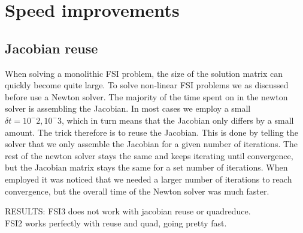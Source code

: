 \chapter{Speed improvements}
\section{Jacobian reuse}
When solving a monolithic FSI problem, the size of the solution matrix can quickly become quite large. To solve non-linear FSI problems we as discussed before use a Newton solver. The majority of the time spent on in the newton solver is assembling the Jacobian. In most cases we employ a small $\delta t = 10^-2, 10^-3$, which in turn means that the Jacobian only differs by a small amount. The trick therefore is to reuse the Jacobian. This is done by telling the solver that we only assemble the Jacobian for a given number of iterations. The rest of the newton solver stays the same and keeps iterating until convergence, but the Jacobian matrix stays the same for a set number of iterations. When employed it was noticed that we needed a larger number of iterations to reach convergence, but the overall time of the Newton solver was much faster.

RESULTS:
FSI3 does not work with jacobian reuse or quadreduce. \\
FSI2 works perfectly with reuse and quad, going pretty fast.